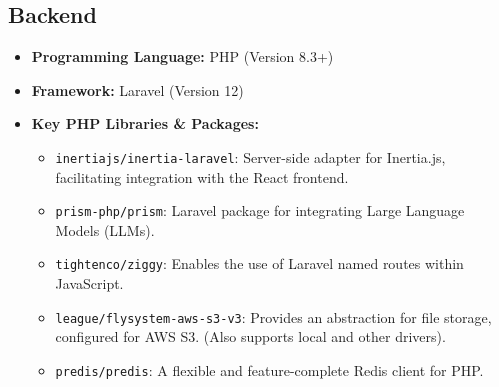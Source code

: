 \documentclass[12pt,a4paper]{article}
\begin{document}
\subsection{Backend}
\begin{itemize}
    \item \textbf{Programming Language:} PHP (Version 8.3+)
    \item \textbf{Framework:} Laravel (Version 12)
    \item \textbf{Key PHP Libraries \& Packages:}
    \begin{itemize}
        \item \texttt{inertiajs/inertia-laravel}: Server-side adapter for Inertia.js, facilitating integration with the React frontend.
        \item \texttt{prism-php/prism}: Laravel package for integrating Large Language Models (LLMs).
        \item \texttt{tightenco/ziggy}: Enables the use of Laravel named routes within JavaScript.
        \item \texttt{league/flysystem-aws-s3-v3}: Provides an abstraction for file storage, configured for AWS S3. (Also supports local and other drivers).
        \item \texttt{predis/predis}: A flexible and feature-complete Redis client for PHP.
    \end{itemize}
\end{itemize}
\end{document}
